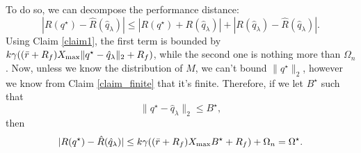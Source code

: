 \documentclass[11pt]{article}
\begin{document}
To do so, we can decompose the performance distance: 
\begin{equation*}
  |R(q^\star) - \hat R(\hat q_\lambda)| \leq |R(q^\star) + R(\hat q_\lambda)| 
  + |R(\hat q_\lambda) - \hat R(\hat q_\lambda)|.
\end{equation*}
Using Claim \ref{claim1}, the first term is bounded by
$k\gamma((\bar r+R_f)X_{\max}\|q^\star - \hat q_\lambda\|_2 + R_f)$, while the second one is
nothing more than $\Omega_n$. Now, unless we know the distribution of $M$, we can't bound
$\|q^\star\|_2$, however we know from Claim \ref{claim_finite} that it's
finite. Therefore, if we let $B^\star$ such that
\begin{equation*}
  \|q^\star - \hat q_\lambda\|_2 \leq B^\star,
\end{equation*}
then
\begin{equation*}
  |R(q^\star) - \hat R(\hat q_\lambda)| \leq k\gamma((\bar r+R_f)X_{\max} B^\star + R_f) +
  \Omega_n = \Omega^\star.
\end{equation*}






\newpage

\end{document}
